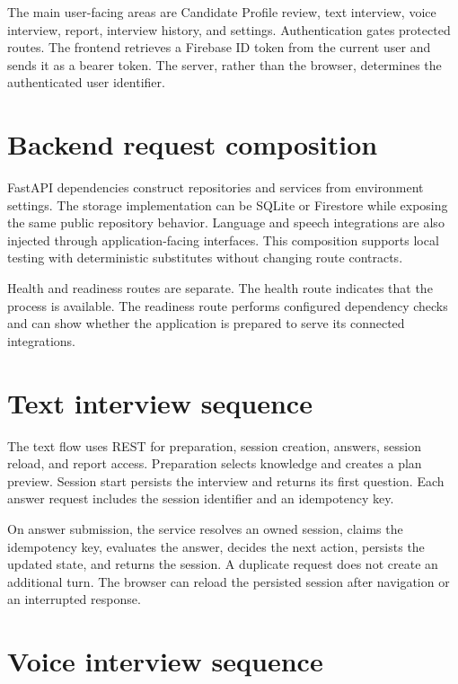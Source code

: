 The main user-facing areas are Candidate Profile review, text interview, voice interview, report, interview history, and settings. Authentication gates protected routes. The frontend retrieves a Firebase ID token from the current user and sends it as a bearer token. The server, rather than the browser, determines the authenticated user identifier.

\section{Backend request composition}

FastAPI dependencies construct repositories and services from environment settings. The storage implementation can be SQLite or Firestore while exposing the same public repository behavior. Language and speech integrations are also injected through application-facing interfaces. This composition supports local testing with deterministic substitutes without changing route contracts.

Health and readiness routes are separate. The health route indicates that the process is available. The readiness route performs configured dependency checks and can show whether the application is prepared to serve its connected integrations.

\section{Text interview sequence}

The text flow uses REST for preparation, session creation, answers, session reload, and report access. Preparation selects knowledge and creates a plan preview. Session start persists the interview and returns its first question. Each answer request includes the session identifier and an idempotency key.


On answer submission, the service resolves an owned session, claims the idempotency key, evaluates the answer, decides the next action, persists the updated state, and returns the session. A duplicate request does not create an additional turn. The browser can reload the persisted session after navigation or an interrupted response.

\section{Voice interview sequence}

